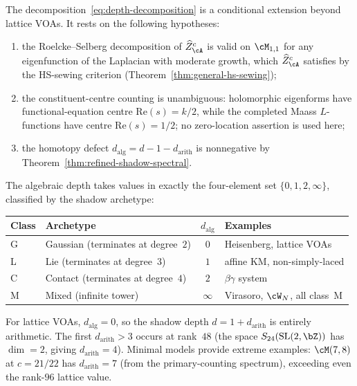 \begin{remark}%
\label{rem:depth-decomposition-universality}%
\ClaimStatusConditional%
%
%
The decomposition~\eqref{eq:depth-decomposition} is a conditional
extension beyond lattice VOAs. It rests on the following hypotheses:
\begin{enumerate}[label=\textup{(\roman*)}]
\item the Roelcke--Selberg decomposition of
 $\widehat{Z}^c_\cA$ is valid on $\cM_{1,1}$ for
 any eigenfunction of the Laplacian with moderate
 growth, which $\widehat{Z}^c_\cA$ satisfies by
 the HS-sewing criterion
 \textup{(}Theorem~\textup{\ref{thm:general-hs-sewing}}\textup{)};
\item the constituent-centre counting is unambiguous: holomorphic
 eigenforms have functional-equation centre $\mathrm{Re}(s)=k/2$,
 while the completed Maass $L$-functions have centre
 $\mathrm{Re}(s)=1/2$; no zero-location assertion is used here;
\item the homotopy defect
 $d_{\mathrm{alg}} = d - 1 - d_{\mathrm{arith}}$ is
 nonnegative by Theorem~\textup{\ref{thm:refined-shadow-spectral}}.
\end{enumerate}

The algebraic depth takes values in exactly the four-element
set $\{0, 1, 2, \infty\}$, classified by the shadow archetype:
\begin{center}
\small
\renewcommand{\arraystretch}{1.2}
\begin{tabular}{llcl}
\toprule
\textbf{Class} & \textbf{Archetype} & $d_{\mathrm{alg}}$ &
 \textbf{Examples} \\
\midrule
G & Gaussian (terminates at degree~$2$) & $0$ &
 Heisenberg, lattice VOAs \\
L & Lie (terminates at degree~$3$) & $1$ &
 affine KM, non-simply-laced \\
C & Contact (terminates at degree~$4$) & $2$ &
 $\beta\gamma$ system \\
M & Mixed (infinite tower) & $\infty$ &
 Virasoro, $\cW_N$, all class~M \\
\bottomrule
\end{tabular}
\end{center}
For lattice VOAs, $d_{\mathrm{alg}} = 0$, so the shadow depth
$d = 1 + d_{\mathrm{arith}}$ is entirely arithmetic.
The first $d_{\mathrm{arith}} > 3$ occurs at rank~$48$
(the space $S_{24}(\mathrm{SL}(2,\bZ))$ has
$\dim = 2$, giving $d_{\mathrm{arith}} = 4$).
Minimal models provide extreme examples:
$\cM(7,8)$ at $c = 21/22$ has
$d_{\mathrm{arith}} = 7$ (from the primary-counting spectrum),
exceeding even the rank-$96$ lattice value.
\end{remark}

